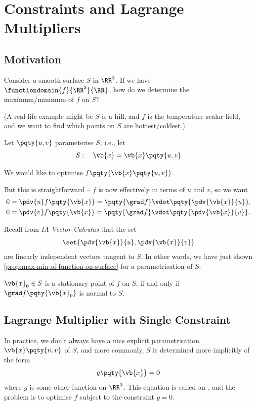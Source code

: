\section{Constraints and Lagrange Multipliers}

\subsection{Motivation}

Consider a smooth surface \(S\) in \(\RR^3\). If we have \(\functiondomain{f}{\RR^3}{\RR}\), how do we determine the maximum/minimum of \(f\) on \(S\)?

(A real-life example might be \(S\) is a hill, and \(f\) is the temperature scalar field, and we want to find which points on \(S\) are hottest/coldest.)

Let \(\pqty{u, v}\) parameterise \(S\), i.e., let
\[
    S: \quad \vb{x} = \vb{x} \pqty{u, v}
\]

We would like to optimise \(f\pqty{\vb{x} \pqty{u, v}}\).

But this is straightforward -- \(f\) is now effectively in terms of \(u\) and \(v\), so we want
\begin{align*}
    0 &= \pdv{u} f\pqty{\vb{x}} = \pqty{\grad f} \vdot \pqty{\pdv{\vb{x}}{u}}, \\
    0 &= \pdv{v} f\pqty{\vb{x}} = \pqty{\grad f} \vdot \pqty{\pdv{\vb{x}}{v}}.
\end{align*}

Recall from \textit{IA Vector Calculus} that the set
\[
    \set{\pdv{\vb{x}}{u}, \pdv{\vb{x}}{v}}
\]
are linearly independent vectors tangent to \(S\). In other words, we have just shown \autoref{prop:max-min-of-function-on-surface} for a parametrisation of \(S\).

\begin{proposition}
    \label{prop:max-min-of-function-on-surface}%
    \(\vb{x}_0 \in S\) is a stationary point of \(f\) on \(S\), if and only if \(\grad f\pqty{\vb{x}_0}\) is normal to \(S\).
\end{proposition}

\subsection{Lagrange Multiplier with Single Constraint}

In practice, we don't always have a nice explicit parametrisation \(\vb{x}\pqty{u, v}\) of \(S\), and more commonly, \(S\) is determined more implicitly of the form
\[
    g\pqty{\vb{x}} = 0
\]
where \(g\) is some other function on \(\RR^3\). This equation is called an , and the problem is to optimise \(f\) subject to the constraint \(g = 0\).

